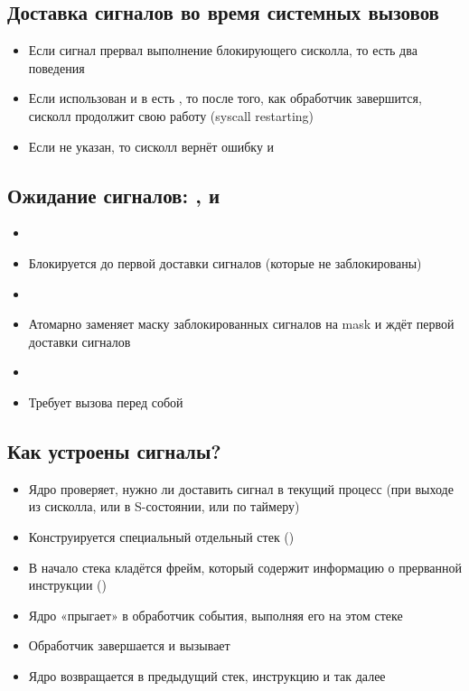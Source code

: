   \subsection{Доставка сигналов во время системных вызовов}
    \begin{itemize}
      \item Если сигнал прервал выполнение блокирующего сисколла, то есть два поведения
      \item Если использован  и в  есть , то после того, как обработчик завершится, сисколл продолжит свою работу (syscall restarting)
      \item Если не указан, то сисколл вернёт ошибку и 
    \end{itemize}

  \subsection{Ожидание сигналов: ,  и }
    \begin{itemize}
      \item {}
      \item Блокируется до первой доставки сигналов (которые не заблокированы)
      \item {}
      \item Атомарно заменяет маску заблокированных сигналов на mask и ждёт первой доставки сигналов
      \item {}
      \item Требует вызова  перед собой
    \end{itemize}
  
  \subsection{Как устроены сигналы?}
    \begin{itemize}
      \item Ядро проверяет, нужно ли доставить сигнал в текущий процесс (при выходе из сисколла, или в S-состоянии, или по таймеру)
      \item Конструируется специальный отдельный стек ()
      \item В начало стека кладётся фрейм, который содержит информацию о прерванной инструкции ()
      \item Ядро «прыгает» в обработчик события, выполняя его на этом стеке
      \item Обработчик завершается и вызывает 
      \item Ядро возвращается в предыдущий стек, инструкцию и так далее
    \end{itemize}
  
